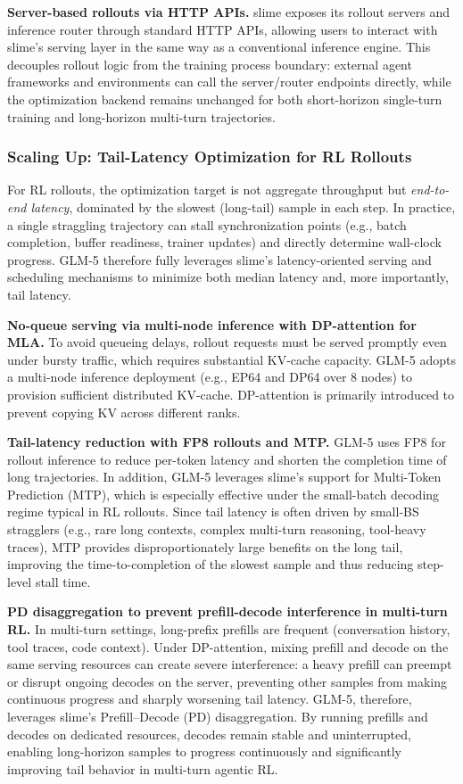 \documentclass{article}
\theoremstyle{definition}
\begin{document}
\textbf{Server-based rollouts via HTTP APIs.} slime exposes its rollout servers and inference router through standard HTTP APIs, allowing users to interact with slime's serving layer in the same way as a conventional inference engine. This decouples rollout logic from the training process boundary: external agent frameworks and environments can call the server/router endpoints directly, while the optimization backend remains unchanged for both short-horizon single-turn training and long-horizon multi-turn trajectories.

\subsubsection{Scaling Up: Tail-Latency Optimization for RL Rollouts}
For RL rollouts, the optimization target is not aggregate throughput but \emph{end-to-end latency}, dominated by the slowest (long-tail) sample in each step. In practice, a single straggling trajectory can stall synchronization points (e.g., batch completion, buffer readiness, trainer updates) and directly determine wall-clock progress. GLM-5 therefore fully leverages slime's latency-oriented serving and scheduling mechanisms to minimize both median latency and, more importantly, tail latency.

\textbf{No-queue serving via multi-node inference with DP-attention for MLA.}
To avoid queueing delays, rollout requests must be served promptly even under bursty traffic, which requires substantial KV-cache capacity. GLM-5 adopts a multi-node inference deployment (e.g., EP64 and DP64 over 8 nodes) to provision sufficient distributed KV-cache. DP-attention is primarily introduced to prevent copying KV across different ranks.

\textbf{Tail-latency reduction with FP8 rollouts and MTP.}
GLM-5 uses FP8 for rollout inference to reduce per-token latency and shorten the completion time of long trajectories. In addition, GLM-5 leverages slime's support for Multi-Token Prediction (MTP), which is especially effective under the small-batch decoding regime typical in RL rollouts. Since tail latency is often driven by small-BS stragglers (e.g., rare long contexts, complex multi-turn reasoning, tool-heavy traces), MTP provides disproportionately large benefits on the long tail, improving the time-to-completion of the slowest sample and thus reducing step-level stall time.

\textbf{PD disaggregation to prevent prefill-decode interference in multi-turn RL.}
In multi-turn settings, long-prefix prefills are frequent (conversation history, tool traces, code context). Under DP-attention, mixing prefill and decode on the same serving resources can create severe interference: a heavy prefill can preempt or disrupt ongoing decodes on the server, preventing other samples from making continuous progress and sharply worsening tail latency. GLM-5, therefore, leverages slime's Prefill--Decode (PD) disaggregation. By running prefills and decodes on dedicated resources, decodes remain stable and uninterrupted, enabling long-horizon samples to progress continuously and significantly improving tail behavior in multi-turn agentic RL.
\end{document}
